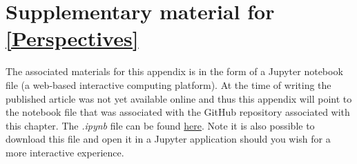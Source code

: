 \anglais
\doublespacing
\chapter{Supplementary material for \autoref{Perspectives}}\label{supp:perspectives}

The associated materials for this appendix is in the form of a Jupyter notebook file (a web-based interactive computing platform). At the time of writing the published article was not yet available online and thus this appendix will point to the notebook file that was associated with the GitHub repository associated with this chapter. The \emph{.ipynb} file can be found \href{https://github.com/PoisotLab/ms_metaweb_perspectives/blob/main/notebooks/SupplementaryMaterial.ipynb}{here}. Note it is also possible to download this file and open it in a Jupyter application should you wish for a more interactive experience.